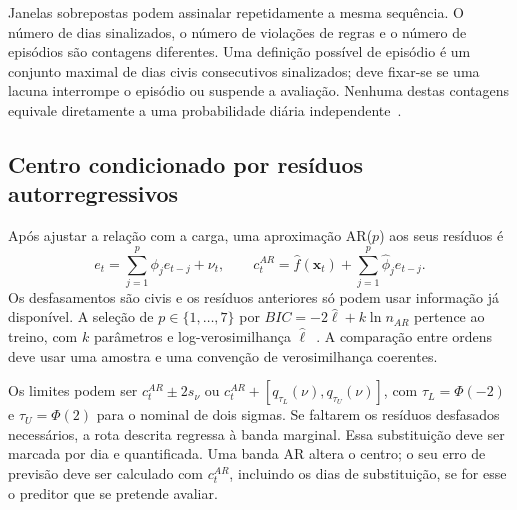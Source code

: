 Janelas sobrepostas podem assinalar repetidamente a mesma sequência. O número de dias sinalizados, o número de violações de regras e o número de episódios são contagens diferentes. Uma definição possível de episódio é um conjunto maximal de dias civis consecutivos sinalizados; deve fixar-se se uma lacuna interrompe o episódio ou suspende a avaliação. Nenhuma destas contagens equivale diretamente a uma probabilidade diária independente~\parencite{Nelson1984,Wardell1994}.


\subsection{Centro condicionado por resíduos autorregressivos}
\label{sec:mat-ar-bandas}
Após ajustar a relação com a carga, uma aproximação AR($p$) aos seus resíduos é
\begin{equation}
e_t=\sum_{j=1}^p\phi_je_{t-j}+\nu_t,
\qquad c_t^{AR}=\widehat f(\boldsymbol x_t)+\sum_{j=1}^p\widehat\phi_je_{t-j}.
\label{eq:mat-centro-ar}
\end{equation}
Os desfasamentos são civis e os resíduos anteriores só podem usar informação já disponível. A seleção de $p\in\{1,\ldots,7\}$ por $BIC=-2\widehat\ell+k\ln n_{AR}$ pertence ao treino, com $k$ parâmetros e log-verosimilhança $\widehat\ell$~\parencite{Schwarz1978}. A comparação entre ordens deve usar uma amostra e uma convenção de verosimilhança coerentes.

Os limites podem ser $c_t^{AR}\pm2s_\nu$ ou $c_t^{AR}+[q_{\tau_L}(\nu),q_{\tau_U}(\nu)]$, com $\tau_L=\Phi(-2)$ e $\tau_U=\Phi(2)$ para o nominal de dois sigmas. Se faltarem os resíduos desfasados necessários, a rota descrita regressa à banda marginal. Essa substituição deve ser marcada por dia e quantificada. Uma banda AR altera o centro; o seu erro de previsão deve ser calculado com $c_t^{AR}$, incluindo os dias de substituição, se for esse o preditor que se pretende avaliar.

